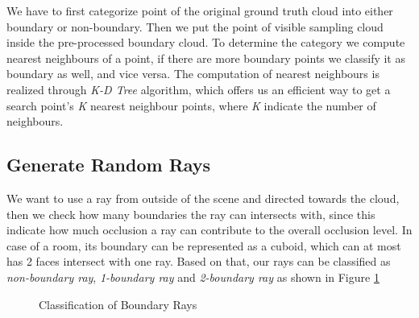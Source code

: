\documentclass[11pt, a4paper,oneside,chapterprefix=false]{scrbook}
\begin{document}
We have to first categorize point of the original ground truth cloud into either boundary or non-boundary. 
Then we put the point of visible sampling cloud inside the pre-processed boundary cloud. To determine the category we compute nearest neighbours of a point, if there are more boundary points we classify it as boundary as well, and vice versa. The computation of nearest neighbours is realized through \textit{K-D Tree} algorithm, which offers us an efficient way to get a search point's \textit{K} nearest neighbour points, where \textit{K} indicate the number of neighbours.


\subsection{Generate Random Rays}

We want to use a ray from outside of the scene and directed towards the cloud, then we check how many boundaries the ray can intersects with, since this indicate how much occlusion a ray can contribute to the overall occlusion level. In case of a room, its boundary can be represented as a cuboid, which can at most has 2 faces intersect with one ray. Based on that, our rays can be classified as \textit{non-boundary ray}, \textit{1-boundary ray} and \textit{2-boundary ray} as shown in Figure \ref{classification of bound ray}

\begin{figure}[H]
    \centering
     \label{fig:non-bound ray}
     \label{fig:1-bound ray}
      \label{fig:2-bounds ray} 
    \caption{Classification of Boundary Rays}
    \label{classification of bound ray}
\end{figure}
\end{document}
